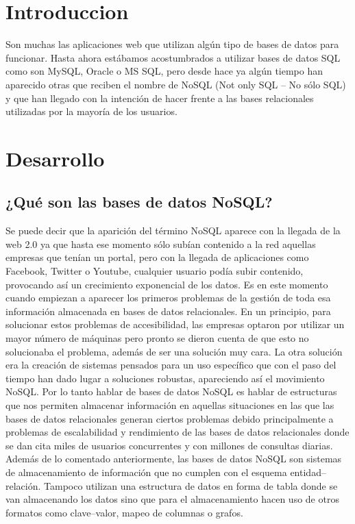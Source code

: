 \documentclass[twoside,twocolumn]{article}
\begin{document}
\section{Introduccion}

Son muchas las aplicaciones web que utilizan algún tipo de bases de 
datos para funcionar. Hasta ahora estábamos acostumbrados a utilizar 
bases de datos SQL como son MySQL, Oracle o MS SQL, pero desde hace ya 
algún tiempo han aparecido otras que reciben el nombre de NoSQL 
(Not only SQL – No sólo SQL) y que han llegado con la intención de hacer
 frente a las bases relacionales utilizadas por la mayoría de los usuarios.

\section{Desarrollo}

\subsection{¿Qué son las bases de datos NoSQL?}

Se puede decir que la aparición del término NoSQL aparece con 
la llegada de la web 2.0 ya que hasta ese momento sólo subían 
contenido a la red aquellas empresas que tenían un portal, pero 
con la llegada de aplicaciones como Facebook, Twitter o Youtube, 
cualquier usuario podía subir contenido, provocando así un crecimiento
exponencial de los datos. Es en este momento cuando empiezan a aparecer
los primeros problemas de la gestión de toda esa información almacenada
en bases de datos relacionales. En un principio, para solucionar estos
problemas de accesibilidad, las empresas optaron por utilizar un mayor
número de máquinas pero pronto se dieron cuenta de que esto no solucionaba 
el problema, además de ser una solución muy cara. La otra solución era la
creación de sistemas pensados para un uso específico que con el 
paso del tiempo han dado lugar a soluciones robustas, apareciendo 
así el movimiento NoSQL. Por lo tanto hablar de bases de datos NoSQL 
es hablar de estructuras que nos permiten almacenar información en aquellas
situaciones en las que las bases de datos relacionales generan ciertos 
problemas debido principalmente a problemas de escalabilidad y rendimiento
de las bases de datos relacionales donde se dan cita miles de usuarios 
concurrentes y con millones de consultas diarias. Además de lo comentado 
anteriormente, las bases de datos NoSQL son sistemas de almacenamiento de
información que no cumplen con el esquema entidad–relación. Tampoco utilizan
una estructura de datos en forma de tabla donde se van almacenando los
datos sino que para el almacenamiento hacen uso de otros formatos como 
clave–valor, mapeo de columnas o grafos.
\end{document}
